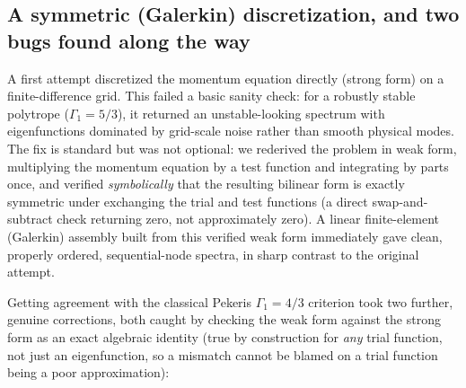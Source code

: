 \documentclass[11pt]{article}
\begin{document}
\subsection{A symmetric (Galerkin) discretization, and two bugs found along the way}
\label{sec:galerkin-bugs}

A first attempt discretized the momentum equation directly (strong form) on a finite-difference grid. This failed a basic sanity check: for a robustly stable polytrope ($\Gamma_1=5/3$), it returned an unstable-looking spectrum with eigenfunctions dominated by grid-scale noise rather than smooth physical modes. The fix is standard but was not optional: we rederived the problem in weak form, multiplying the momentum equation by a test function and integrating by parts once, and verified \emph{symbolically} that the resulting bilinear form is exactly symmetric under exchanging the trial and test functions (a direct swap-and-subtract check returning zero, not approximately zero). A linear finite-element (Galerkin) assembly built from this verified weak form immediately gave clean, properly ordered, sequential-node spectra, in sharp contrast to the original attempt.

Getting agreement with the classical Pekeris $\Gamma_1=4/3$ criterion \citep{Pekeris1938} took two further, genuine corrections, both caught by checking the weak form against the strong form as an exact algebraic identity (true by construction for \emph{any} trial function, not just an eigenfunction, so a mismatch cannot be blamed on a trial function being a poor approximation):
\end{document}
